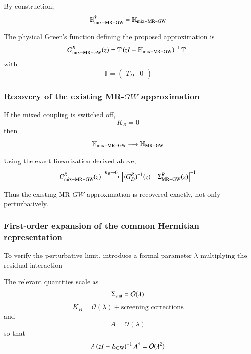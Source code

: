\documentclass[aip,jcp,reprint,noshowkeys,superscriptaddress]{revtex4-1}
\begin{document}
By construction,
\begin{equation}
  \mathbb H_{\rm mix-MR-GW}^\dagger
  =
  \mathbb H_{\rm mix-MR-GW}
  \label{eq:H-common-Hermitian}
\end{equation}

The physical Green's function defining the proposed approximation is
\begin{equation}
  G_{\rm mix-MR-GW}^{R}(z)
  =
  \mathbb T
  \left(
    zI-\mathbb H_{\rm mix-MR-GW}
  \right)^{-1}
  \mathbb T^\dagger
  \label{eq:G-common-final}
\end{equation}
with
\begin{equation}
  \mathbb T
  =
  \begin{pmatrix}
    T_D&0
  \end{pmatrix}
\end{equation}


\subsubsection{Recovery of the existing MR-$GW$ approximation}

If the mixed coupling is switched off,
\begin{equation}
  K_B=0
\end{equation}
then
\begin{equation}
  \mathbb H_{\rm mix-MR-GW}
  \longrightarrow
  \mathbb H_{\rm MR-GW}
\end{equation}

Using the exact linearization derived above,
\begin{equation}
  G_{\rm mix-MR-GW}^{R}(z)
  \xrightarrow{K_B\to0}
  \left[
    (G_D^R)^{-1}(z)
    -
    \Sigma_{\rm MR-GW}^{R}(z)
  \right]^{-1}
  \label{eq:KB-zero-MRGW}
\end{equation}

Thus the existing MR-$GW$ approximation is recovered exactly, not only
perturbatively.


\subsubsection{First-order expansion of the common Hermitian representation}

To verify the perturbative limit, introduce a formal parameter
$\lambda$ multiplying the residual interaction.

The relevant quantities scale as
\begin{equation}
  \Sigma_{\rm stat}
  =
  \mathcal O(\lambda)
\end{equation}
\begin{equation}
  K_B
  =
  \mathcal O(\lambda)
  +
  \text{screening corrections}
\end{equation}
and
\begin{equation}
  A
  =
  \mathcal O(\lambda)
\end{equation}
so that
\begin{equation}
  A
  \left(
    zI-E_{\rm GW}
  \right)^{-1}
  A^\dagger
  =
  \mathcal O(\lambda^2)
\end{equation}
\end{document}
